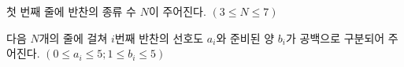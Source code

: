 
첫 번째 줄에 반찬의 종류 수 $N$이 주어진다. $(3 \le N \le 7)$

다음 $N$개의 줄에 걸쳐 $i$번째 반찬의 선호도 $a_i$와 준비된 양 $b_i$가 공백으로 구분되어 주어진다. $(0 \le a_i\le 5; 1 \le b_i \le 5)$
